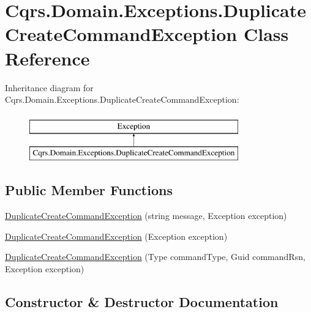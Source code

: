\hypertarget{classCqrs_1_1Domain_1_1Exceptions_1_1DuplicateCreateCommandException}{}\section{Cqrs.\+Domain.\+Exceptions.\+Duplicate\+Create\+Command\+Exception Class Reference}
\label{classCqrs_1_1Domain_1_1Exceptions_1_1DuplicateCreateCommandException}
Inheritance diagram for Cqrs.\+Domain.\+Exceptions.\+Duplicate\+Create\+Command\+Exception\+:\begin{figure}[H]
\begin{center}
\leavevmode
\includegraphics[height=2.000000cm]{classCqrs_1_1Domain_1_1Exceptions_1_1DuplicateCreateCommandException}
\end{center}
\end{figure}
\subsection*{Public Member Functions}
\begin{DoxyCompactItemize}
\item 
\hyperlink{classCqrs_1_1Domain_1_1Exceptions_1_1DuplicateCreateCommandException_a0e8200ecbb5356dcb91eff89c7376784}{Duplicate\+Create\+Command\+Exception} (string message, Exception exception)
\item 
\hyperlink{classCqrs_1_1Domain_1_1Exceptions_1_1DuplicateCreateCommandException_af7b3528197bfb3e1b1b67ac286268913}{Duplicate\+Create\+Command\+Exception} (Exception exception)
\item 
\hyperlink{classCqrs_1_1Domain_1_1Exceptions_1_1DuplicateCreateCommandException_a1e128e58b355384c3db1d0b1fbbe411a}{Duplicate\+Create\+Command\+Exception} (Type command\+Type, Guid command\+Rsn, Exception exception)
\end{DoxyCompactItemize}


\subsection{Constructor \& Destructor Documentation}
\mbox{\label{classCqrs_1_1Domain_1_1Exceptions_1_1DuplicateCreateCommandException_a0e8200ecbb5356dcb91eff89c7376784}} 

